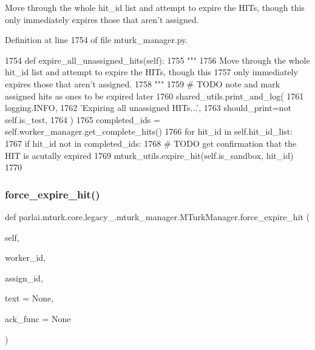 \begin{DoxyVerb}Move through the whole hit_id list and attempt to expire the HITs, though this
only immediately expires those that aren't assigned.
\end{DoxyVerb}
 

Definition at line 1754 of file mturk\+\_\+manager.\+py.


\begin{DoxyCode}
1754     \textcolor{keyword}{def }expire\_all\_unassigned\_hits(self):
1755         \textcolor{stringliteral}{"""}
1756 \textcolor{stringliteral}{        Move through the whole hit\_id list and attempt to expire the HITs, though this}
1757 \textcolor{stringliteral}{        only immediately expires those that aren't assigned.}
1758 \textcolor{stringliteral}{        """}
1759         \textcolor{comment}{# TODO note and mark assigned hits as ones to be expired later}
1760         shared\_utils.print\_and\_log(
1761             logging.INFO,
1762             \textcolor{stringliteral}{'Expiring all unassigned HITs...'},
1763             should\_print=\textcolor{keywordflow}{not} self.is\_test,
1764         )
1765         completed\_ids = self.worker\_manager.get\_complete\_hits()
1766         \textcolor{keywordflow}{for} hit\_id \textcolor{keywordflow}{in} self.hit\_id\_list:
1767             \textcolor{keywordflow}{if} hit\_id \textcolor{keywordflow}{not} \textcolor{keywordflow}{in} completed\_ids:
1768                 \textcolor{comment}{# TODO get confirmation that the HIT is acutally expired}
1769                 mturk\_utils.expire\_hit(self.is\_sandbox, hit\_id)
1770 
\end{DoxyCode}
\mbox{\label{classparlai_1_1mturk_1_1core_1_1legacy__2018_1_1mturk__manager_1_1MTurkManager_ad9c96da368b11cda593782cbbdadd940}} 
\subsubsection{\texorpdfstring{force\+\_\+expire\+\_\+hit()}{force\_expire\_hit()}}
{\footnotesize\ttfamily def parlai.\+mturk.\+core.\+legacy\+\_.\+mturk\+\_\+manager.\+M\+Turk\+Manager.\+force\+\_\+expire\+\_\+hit (\begin{DoxyParamCaption}\item[{}]{self,  }\item[{}]{worker\+\_\+id,  }\item[{}]{assign\+\_\+id,  }\item[{}]{text = {\ttfamily None},  }\item[{}]{ack\+\_\+func = {\ttfamily None} }\end{DoxyParamCaption})}

